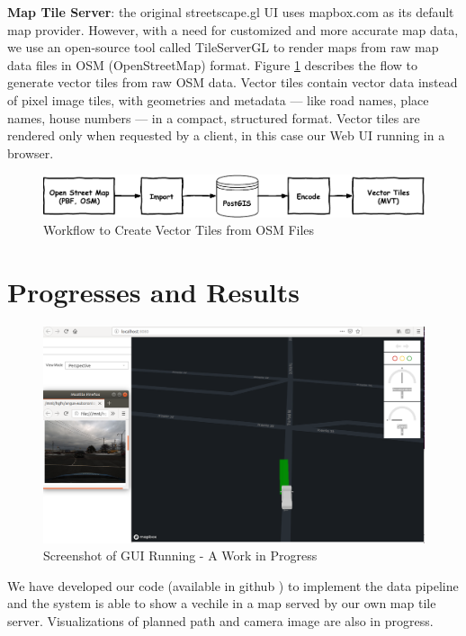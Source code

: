 \documentclass{article}
\begin{document}
\textbf{Map Tile Server}: the original streetscape.gl UI uses mapbox.com as its default map provider. However, with a need for customized and more accurate map data, we use an open-source tool called TileServerGL \cite{vectortile1} to render maps from raw map data files in OSM (OpenStreetMap) format. Figure \ref{fig:map-flow} describes the flow to generate vector tiles from raw OSM data. Vector tiles contain vector data instead of pixel image tiles, with geometries and metadata — like road names, place names, house numbers — in a compact, structured format. Vector tiles are rendered only when requested by a client, in this case our Web UI running in a browser. 

\begin{figure}[htb]
  \centering
  \includegraphics[width=0.8\linewidth]{map-data-flow.pdf}
  \caption{Workflow to Create Vector Tiles from OSM Files}
  \label{fig:map-flow}
\end{figure}

\section{Progresses and Results}

\begin{figure}[hb]
  \centering
  \includegraphics[width=0.7\linewidth]{screenshot.png}
  \caption{Screenshot of GUI Running - A Work in Progress}
  \label{fig:screenshot}
\end{figure}

We have developed our code (available in github \cite{github}) to implement the data pipeline and the system is able to show a vechile in a map served by our own map tile server. Visualizations of planned path and camera image are also in progress.
\end{document}
